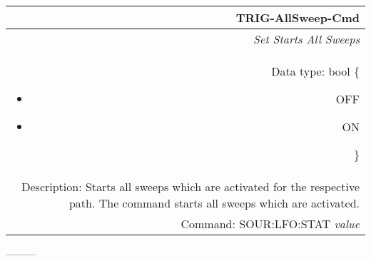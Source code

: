 \documentclass[openany]{article}
\begin{document}
%
		\begin{tabular}{N}
			\hline
			\bfseries TRIG-AllSweep-Cmd \\ \hline
			\emph{Set Starts All Sweeps} \\
			Data type: bool \{\begin{itemize}[noitemsep]
				\small
				\item[] OFF
				\item[] ON
			\end{itemize}\} \\
			Description: Starts all sweeps which are activated for the respective path. The command starts all sweeps which are activated. \\
			Command: SOUR:LFO:STAT \emph{value} \\

		\end{tabular}
%


---------
\end{document}
